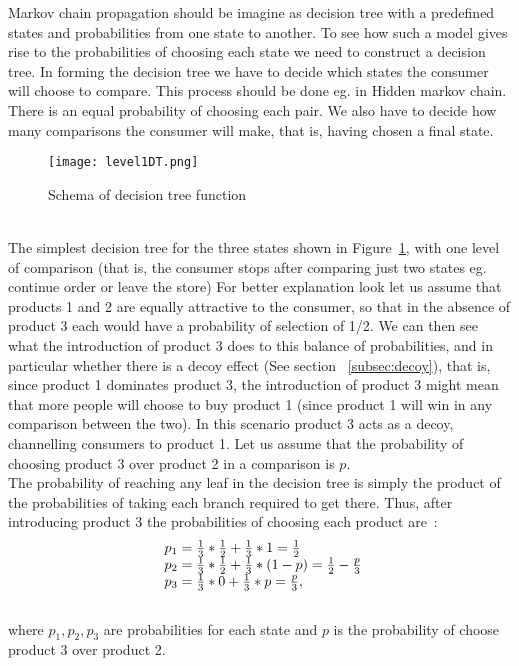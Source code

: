  \label{sec:networks}
Markov chain propagation should be imagine as decision tree with a predefined states and probabilities from one state to another.
To see how such a model gives rise to the probabilities of choosing each state we need to
construct a decision tree. In forming the decision tree we have to decide which states the consumer
will choose to compare. This process should be done eg. in Hidden markov chain.
There is an equal probability of choosing each pair. We also have to decide how many comparisons the consumer
will make, that is, having chosen a final state.\\
\begin{figure}[h!]
	\begin{center}
		\texttt{[image: level1DT.png]}
	\end{center}
	\caption{Schema of decision tree function~\cite{patel}}
	\label{DT1}
\end{figure}\\
The simplest decision tree for the three states shown in Figure~\ref{DT1}, with one level of
comparison (that is, the consumer stops after comparing just two states eg. continue order or leave the store)
For better explanation look let us assume that products 1 and 2 are equally attractive to the consumer, so that in the absence of
product 3 each would have a probability of selection of 1/2.
We can then see what the introduction of product 3 does to this balance of probabilities, and in particular whether there is a decoy effect (See section ~\ref{subsec:decoy}),
that is, since product 1 dominates product 3, the introduction of product 3 might mean that more people will choose to buy product 1 (since product 1 will win in any comparison between the two).
In this scenario product 3 acts as a decoy, channelling consumers to product 1.
Let us assume that the probability of choosing product 3 over product 2 in a comparison is $p$.\\
The probability of reaching any leaf in the decision tree is simply the product of the probabilities of
taking each branch required to get there.
Thus, after introducing product 3 the probabilities of choosing each product are~\cite{patel}:\\

\begin{equation} \label{eq:12}
\begin{array}{l@{}l}
	p_1 = \frac{1}{3}*\frac{1}{2}+\frac{1}{3}*1 = \frac{1}{2} \\
	p_2 = \frac{1}{3}*\frac{1}{2}+\frac{1}{3}*(1-p) = \frac{1}{2} - \frac{p}{3} \\
	p_3 = \frac{1}{3}*0+\frac{1}{3}*p = \frac{p}{3},
\end{array}
\end{equation}\\
where $p_1,p_2,p_3$ are probabilities for each state and $p$ is the probability of choose product 3 over product 2.\\
\\
